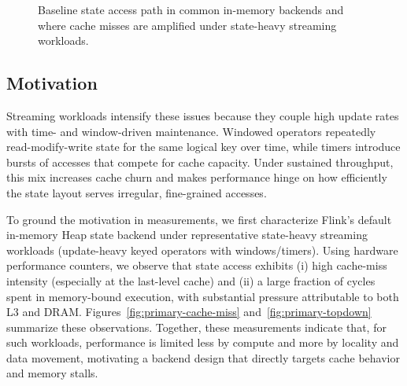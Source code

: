\documentclass[sigconf]{acmart}
\begin{document}
\begin{figure}[t]
  \centering
  \caption{Baseline state access path in common in-memory backends and where cache misses are amplified under state-heavy streaming workloads.}
  \label{fig:state-access-path}
\end{figure}

\subsection{Motivation}
Streaming workloads intensify these issues because they couple high update rates with time- and window-driven maintenance.
Windowed operators repeatedly read-modify-write state for the same logical key over time, while timers introduce bursts of accesses that compete for cache capacity.
Under sustained throughput, this mix increases cache churn and makes performance hinge on how efficiently the state layout serves irregular, fine-grained accesses.

To ground the motivation in measurements, we first characterize Flink's default in-memory Heap state backend under representative state-heavy streaming workloads (update-heavy keyed operators with windows/timers).
Using hardware performance counters, we observe that state access exhibits (i) high cache-miss intensity (especially at the last-level cache) and (ii) a large fraction of cycles spent in memory-bound execution, with substantial pressure attributable to both L3 and DRAM.
Figures~\ref{fig:primary-cache-miss} and~\ref{fig:primary-topdown} summarize these observations.
Together, these measurements indicate that, for such workloads, performance is limited less by compute and more by locality and data movement, motivating a backend design that directly targets cache behavior and memory stalls.
\end{document}
